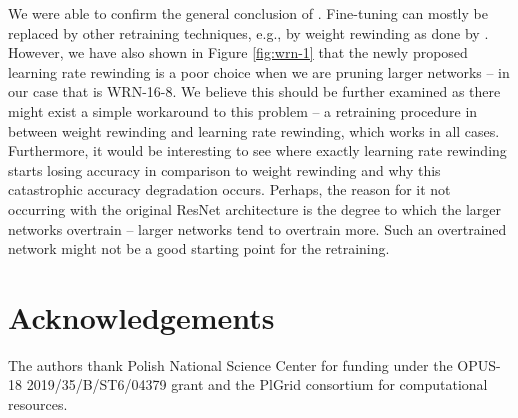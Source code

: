 We were able to confirm the general conclusion of \cite{Renda}. Fine-tuning can mostly be replaced by other retraining techniques, e.g., by weight rewinding as done by \cite{Frankle}. However, we have also shown in Figure \ref{fig:wrn-1} that the newly proposed learning rate rewinding is a poor choice when we are pruning larger networks -- in our case that is WRN-16-8. We believe this should be further examined as there might exist a simple workaround to this problem -- a retraining procedure in between weight rewinding and learning rate rewinding, which works in all cases. Furthermore, it would be interesting to see where exactly learning rate rewinding starts losing accuracy in comparison to weight rewinding and why this catastrophic accuracy degradation occurs. Perhaps, the reason for it not occurring with the original ResNet architecture is the degree to which the larger networks overtrain -- larger networks tend to overtrain more. Such an overtrained network might not be a good starting point for the retraining.


\section*{Acknowledgements}
The authors thank Polish National Science Center for funding
under the OPUS-18 2019/35/B/ST6/04379 grant and the PlGrid
consortium for computational resources.
